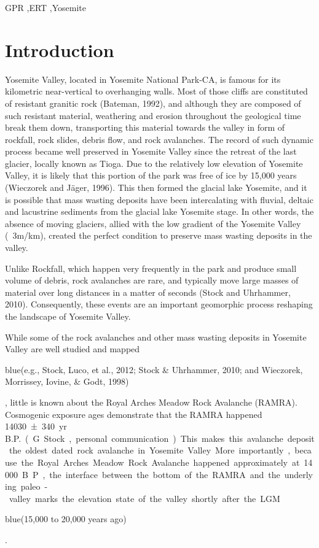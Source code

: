 \documentclass[5p]{elsarticle}
\newcommand{\COMON}{\begin{color}{blue}}
\newcommand{\COMOFF}{\end{color}}
\begin{document}
\begin{frontmatter}
\begin{abstract}
									\end{abstract}

					\begin{keyword}
GPR \sep ERT \sep Yosemite
					\end{keyword}

	\end{frontmatter}


\section{Introduction}

Yosemite Valley, located in Yosemite National Park-CA, is famous for its kilometric near-vertical to overhanging walls. Most of those cliffs are constituted of resistant granitic rock (Bateman, 1992), and although they are composed of such resistant material, weathering and erosion throughout the geological time break them down, transporting this material towards the valley in form of rockfall, rock slides, debris flow, and rock avalanches. The record of such dynamic process became well preserved in Yosemite Valley since the retreat of the last glacier, locally known as Tioga. Due to the relatively low elevation of Yosemite Valley, it is likely that this portion of the park was free of ice by 15,000 years (Wieczorek and J\"ager, 1996). This then formed the glacial lake Yosemite, and it is possible that mass wasting deposits have been intercalating with fluvial, deltaic and lacustrine sediments from the glacial lake Yosemite stage.   In other words, the absence of moving glaciers, allied with the low gradient of the Yosemite Valley (~3m/km), created the perfect condition to preserve mass wasting deposits in the valley. 

Unlike Rockfall, which happen very frequently in the park and produce small volume of debris, rock avalanches are rare, and typically move large masses of material over long distances in a matter of seconds (Stock and Uhrhammer, 2010). Consequently, these events are an important geomorphic process reshaping the landscape of Yosemite Valley. 

While some of the rock avalanches and other mass wasting deposits in Yosemite Valley are well studied and mapped \COMON(e.g., Stock, Luco, et al., 2012;  Stock \& Uhrhammer, 2010; and Wieczorek, Morrissey, Iovine, \& Godt, 1998) \COMOFF, little is known about the Royal Arches Meadow Rock Avalanche (RAMRA). Cosmogenic  exposure ages demonstrate that the RAMRA happened \SI{14030 \pm 340}{yr\, B.P.} (G. Stock, personal communication). This makes this avalanche deposit the oldest dated rock avalanche in Yosemite Valley. More importantly, because the Royal Arches Meadow Rock Avalanche happened approximately at 14000 B.P., the interface between the bottom of the RAMRA and the underlying paleo-valley marks the elevation state of the valley shortly after the LGM \COMON(15,000 to 20,000 years ago)\COMOFF. 
\end{document}
